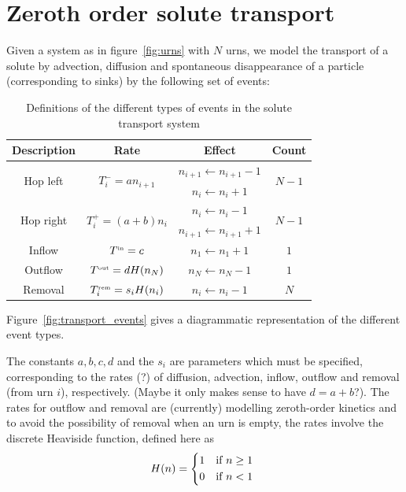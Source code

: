 \section{Zeroth order solute transport}
Given a system as in figure~\ref{fig:urns} with \(N\) urns, we model the
transport of a solute by advection, diffusion and spontaneous disappearance of a
particle (corresponding to sinks) by the following set of events:

\begin{table}[ht!]
    \centering
    \begin{tabular}{ c | c | c | c }
        Description & Rate & Effect & Count \\ \hline\hline
        \multirow{2}{*}{Hop left} & \multirow{2}{*}{\(T^-_i = a n_{i+1}\)} &
        \(n_{i+1} \leftarrow n_{i+1} - 1\) & \multirow{2}{*}{\(N-1\)} \\
        & & \(n_i \leftarrow n_i + 1\) \\ \hline
        \multirow{2}{*}{Hop right} & \multirow{2}{*}{\(T^+_i = (a+b) n_i\)} &
        \(n_i \leftarrow n_i - 1\) & \multirow{2}{*}{\(N-1\)} \\
        & & \(n_{i+1} \leftarrow n_{i+1} + 1\) \\ \hline
        Inflow & \(T^\text{\tiny in} = c\) & \(n_1 \leftarrow n_1 + 1\) & \(1\) \\ \hline
        Outflow & \(T^\text{\tiny out} = d H(n_N)\) & \(n_N \leftarrow n_N - 1\) & \(1\) \\ \hline
        Removal & \(T^\text{\tiny rem}_i = s_i H(n_i)\) & \(n_i \leftarrow n_i - 1\) & \(N\) \\
    \end{tabular}
    \caption{\label{tab:transport_events}Definitions of the different types of
events in the solute transport system}
\end{table}
Figure~\ref{fig:transport_events} gives a diagrammatic representation of the
different event types.

The constants \(a,b,c,d\) and the \(s_i\) are parameters which must be
specified, corresponding to the rates (?) of diffusion, advection, inflow,
outflow and removal (from urn \(i\)), respectively. (Maybe it only makes sense to have
\(d=a+b\)?). The rates for outflow and removal are (currently) modelling
zeroth-order kinetics and to avoid the possibility of removal when an urn is
empty, the rates involve the discrete Heaviside function, defined
here as
\begin{equation*}
    H(n) =
    \begin{dcases*}
        1 & if \(n \ge 1\)\\
        0 & if \(n < 1\)
    \end{dcases*}
\end{equation*}


